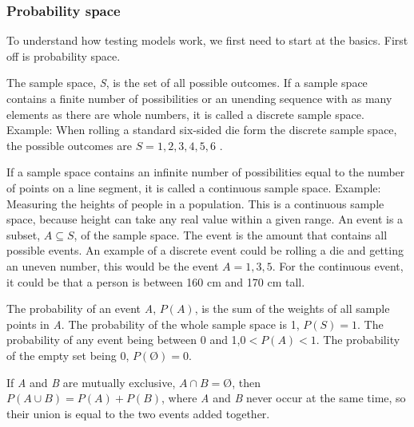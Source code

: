 \subsubsection{Probability space}
To understand how testing models work, we first need to start at the basics. First off is probability space. 

The sample space, \textit{S}, is the set of all possible outcomes.
\newline
If a sample space contains a finite number of possibilities or an unending sequence with as many elements as there are whole numbers, it is called a discrete sample space.
\newline
Example: When rolling a standard six-sided die form the discrete sample space, the possible outcomes are $S={1,2,3,4,5,6}$ .
\newline

\noindent If a sample space contains an infinite number of possibilities equal to the number of points on a line segment, it is called a continuous sample space.
\break
Example: Measuring the heights of people in a population. This is a continuous sample space, because height can take any real value within a given range. 
\newline
An event is a subset, $A\subseteq S$, of the sample space. The event is the amount that contains all possible events.
An example of a discrete event could be rolling a die and getting an uneven number, this would be the event $A={1,3,5}$.
\newline 
For the continuous event, it could be that a person is between 160 cm and 170 cm tall.
\newline

\noindent The probability of an event \textit{A}, $P(A)$, is the sum of the weights of all sample points in \textit{A}.
The probability of the whole sample space is 1, $P(S)=1$.
The probability of any event being between 0 and 1,$0<P(A)<1$.
The probability of the empty set being 0, $P(Ø)=0$.
\newline
\newline

\noindent If \textit{A} and \textit{B} are mutually exclusive, $A \cap B=Ø$, then
\newline
$P(A \cup B) = P(A)+P(B)$,
\newline
\newline
where \textit{A} and \textit{B} never occur at the same time, so their union is equal to the two events added together. 
\newline

